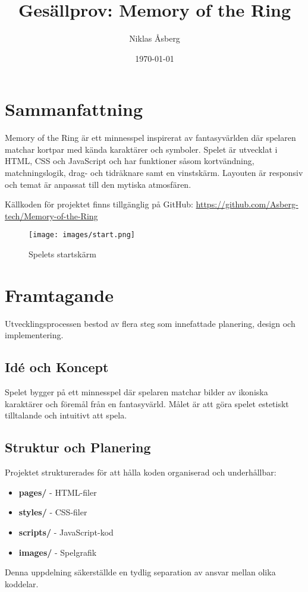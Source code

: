 \documentclass[a4paper,12pt]{article}
\title{\textbf{Gesällprov: Memory of the Ring}}
\author{Niklas Åsberg}
\date{\today}
\begin{document}
\maketitle

\section*{Sammanfattning}
Memory of the Ring är ett minnesspel inspirerat av fantasyvärlden där spelaren matchar kortpar med kända karaktärer och symboler. Spelet är utvecklat i HTML, CSS och JavaScript och har funktioner såsom kortvändning, matchningslogik, drag- och tidräknare samt en vinstskärm. Layouten är responsiv och temat är anpassat till den mytiska atmosfären.

Källkoden för projektet finns tillgänglig på GitHub: \url{https://github.com/Asberg-tech/Memory-of-the-Ring}

\begin{figure}[h]
    \centering
    \texttt{[image: images/start.png]}
    \caption{Spelets startskärm}
    \label{fig:game_start}
\end{figure}

\section*{Framtagande}
Utvecklingsprocessen bestod av flera steg som innefattade planering, design och implementering.

\subsection*{Idé och Koncept}
Spelet bygger på ett minnesspel där spelaren matchar bilder av ikoniska karaktärer och föremål från en fantasyvärld. Målet är att göra spelet estetiskt tilltalande och intuitivt att spela.

\subsection*{Struktur och Planering}
Projektet strukturerades för att hålla koden organiserad och underhållbar:
\begin{itemize}
    \item \textbf{pages/} - HTML-filer
    \item \textbf{styles/} - CSS-filer
    \item \textbf{scripts/} - JavaScript-kod
    \item \textbf{images/} - Spelgrafik
\end{itemize}
Denna uppdelning säkerställde en tydlig separation av ansvar mellan olika koddelar.
\end{document}
